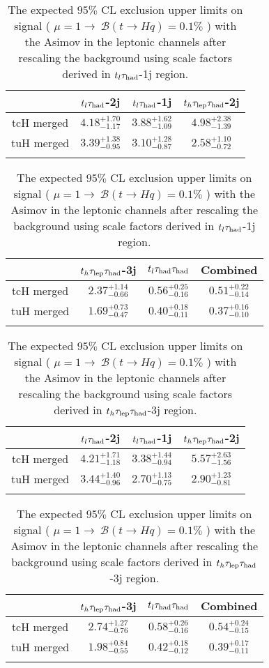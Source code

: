 \begin{table}
\centering
\begin{tabular}{cccc} \toprule\toprule
 & $t_l\tau_\text{had}$-2j & $t_l\tau_\text{had}$-1j & $t_h\tau_\text{lep}{}\tau_\text{had}$-2j\\\midrule
tcH merged & $4.18^{+1.70}_{-1.17}$ & $3.88^{+1.62}_{-1.09}$ & $4.98^{+2.38}_{-1.39}$\\
tuH merged & $3.39^{+1.38}_{-0.95}$ & $3.10^{+1.28}_{-0.87}$ & $2.58^{+1.10}_{-0.72}$\\
\bottomrule\bottomrule\\
\end{tabular}
\begin{tabular}{cccc} \toprule\toprule
 & $t_h\tau_\text{lep}{}\tau_\text{had}$-3j & $t_l\tau_\text{had}{}\tau_\text{had}$ & Combined\\\midrule
tcH merged & $2.37^{+1.14}_{-0.66}$ & $0.56^{+0.25}_{-0.16}$ & $0.51^{+0.22}_{-0.14}$\\
tuH merged & $1.69^{+0.73}_{-0.47}$ & $0.40^{+0.18}_{-0.11}$ & $0.37^{+0.16}_{-0.10}$\\
\bottomrule\bottomrule\\
\end{tabular}
\caption{The expected $95\%$ CL exclusion upper limits on signal ( $\mu=1\to~\mathcal{B}(t\to Hq)=0.1\%$ ) with the Asimov in the leptonic channels after rescaling the background using scale factors derived in $t_l\tau_\text{had}$-1j region.} 
\label{tab:tthML_rescaled_limit_fake_1j}
\end{table}



\begin{table}
\centering
\begin{tabular}{cccc} \toprule\toprule
 & $t_l\tau_\text{had}$-2j & $t_l\tau_\text{had}$-1j & $t_h\tau_\text{lep}{}\tau_\text{had}$-2j\\\midrule
tcH merged & $4.21^{+1.71}_{-1.18}$ & $3.38^{+1.44}_{-0.94}$ & $5.57^{+2.63}_{-1.56}$\\
tuH merged & $3.44^{+1.40}_{-0.96}$ & $2.70^{+1.13}_{-0.75}$ & $2.90^{+1.23}_{-0.81}$\\
\bottomrule\bottomrule\\
\end{tabular}
\begin{tabular}{cccc} \toprule\toprule
 & $t_h\tau_\text{lep}{}\tau_\text{had}$-3j & $t_l\tau_\text{had}{}\tau_\text{had}$ & Combined\\\midrule
tcH merged & $2.74^{+1.27}_{-0.76}$ & $0.58^{+0.26}_{-0.16}$ & $0.54^{+0.24}_{-0.15}$\\
tuH merged & $1.98^{+0.84}_{-0.55}$ & $0.42^{+0.18}_{-0.12}$ & $0.39^{+0.17}_{-0.11}$\\
\bottomrule\bottomrule\\
\end{tabular}
\caption{The expected $95\%$ CL exclusion upper limits on signal ( $\mu=1\to~\mathcal{B}(t\to Hq)=0.1\%$ ) with the Asimov in the leptonic channels after rescaling the background using scale factors derived in $t_h\tau_\text{lep}{}\tau_\text{had}$-3j region.} 
\label{tab:tthML_rescaled_limit_fake_3j}
\end{table}




